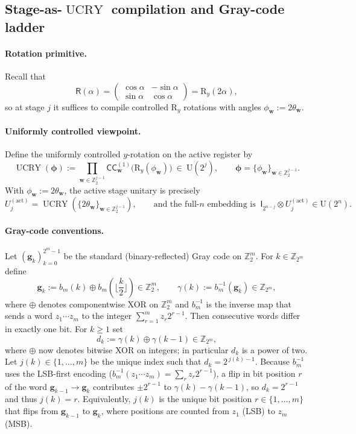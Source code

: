 \documentclass{article}
\DeclareMathOperator{\UCRY}{UCRY}
\newcommand{\CC}{\mathsf{C}\mathsf{C}}
\newcommand{\rI}{\mathsf{I}}
\newcommand{\rR}{\mathsf{R}}
\newcommand{\RY}{\mathrm{R}_y}
\numberwithin{equation}{section}
\begin{document}
\subsection{Stage-as-$\UCRY$ compilation and Gray-code ladder}\label{subsec:transpilation_compilation}

\paragraph{Rotation primitive.}
Recall that
\[
\rR(\alpha)=
\begin{pmatrix}
\cos\alpha & -\sin\alpha\\
\sin\alpha & \cos\alpha
\end{pmatrix}
=\RY(2\alpha),
\]
so at stage $j$ it suffices to compile controlled $\RY$ rotations with angles $\phi_{\mathbf{w}}:=2\theta_{\mathbf{w}}$.

\paragraph{Uniformly controlled viewpoint.}
Define the uniformly controlled $y$-rotation on the active register by
\[
\UCRY(\bm{\phi})
:=\prod_{\mathbf{w}\in\mathbb{Z}_2^{j-1}} \CC_{\mathbf{w}}^{(1)}\!\bigl(\RY(\phi_{\mathbf{w}})\bigr)\ \in\ \mathrm{U}(2^j),
\qquad
\bm{\phi}=\{\phi_{\mathbf{w}}\}_{\mathbf{w}\in\mathbb Z_2^{j-1}}.
\]
With $\phi_{\mathbf{w}}:=2\theta_{\mathbf{w}}$, the active stage unitary is precisely
\[
U_j^{\mathrm{(act)}}=\UCRY(\{2\theta_{\mathbf{w}}\}_{\mathbf{w}\in\mathbb Z_2^{j-1}}),
\qquad
\text{and the full-$n$ embedding is }\ \rI_{2^{n-j}}\otimes U_j^{\mathrm{(act)}}\in\mathrm U(2^n).
\]

\paragraph{Gray-code conventions.} Let $(\mathbf{g}_k)_{k=0}^{2^m-1}$ be the standard (binary-reflected) Gray code on $\mathbb{Z}_2^m$.
For $k\in\mathbb{Z}_{2^m}$ define
\[
\mathbf{g}_k:=b_m(k)\oplus b_m\!\left(\Big\lfloor\frac{k}{2}\Big\rfloor\right)\in\mathbb{Z}_2^m,
\qquad
\gamma(k):=b_m^{-1}(\mathbf{g}_k)\in\mathbb{Z}_{2^m},
\]
where $\oplus$ denotes componentwise XOR on $\mathbb{Z}_2^m$ and $b_m^{-1}$ is the inverse map
that sends a word $z_1\cdots z_m$ to the integer $\sum_{r=1}^m z_r2^{r-1}$.
Then consecutive words differ in exactly one bit.
For $k\ge 1$ set
\[
d_k:=\gamma(k)\oplus \gamma(k-1)\in\mathbb{Z}_{2^m},
\]
where $\oplus$ now denotes bitwise XOR on integers; in particular $d_k$ is a power of two.
Let $j(k)\in\{1,\dots,m\}$ be the unique index such that $d_k=2^{\,j(k)-1}$.
Because $b_m^{-1}$ uses the LSB-first encoding ($b_m^{-1}(z_1\cdots z_m)=\sum_r z_r 2^{r-1}$),
a flip in bit position $r$ of the word $\mathbf{g}_{k-1}\to\mathbf{g}_k$ contributes $\pm 2^{r-1}$ to
$\gamma(k)-\gamma(k-1)$, so $d_k=2^{r-1}$ and thus $j(k)=r$.
Equivalently, $j(k)$ is the unique bit position $r\in\{1,\dots,m\}$ that flips from $\mathbf{g}_{k-1}$ to $\mathbf{g}_k$,
where positions are counted from $z_1$ (LSB) to $z_m$ (MSB).
\end{document}
